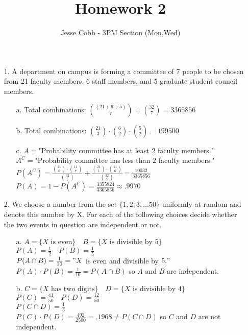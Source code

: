 \documentclass[11pt]{amsart}
\theoremstyle{definition}
\begin{document}
\title{Homework 2}

\author{Jesse Cobb - 3PM Section (Mon,Wed)}

\maketitle

\begin{itemize}
\item[1.] A department on campus is forming a committee of 7 people to be chosen from 21 faculty members, 6 staff members, and 5 graduate student council members.
\begin{itemize}
    \item[a.] Total combinations: ${(21+6+5)\choose 7}={32\choose 7}=3365856$

    \item[b.] Total combinations: ${21\choose 3} \cdot {6\choose 2}\cdot {5\choose 2}=199500$

    \item[c.] $A=$"Probability committee has at least $2$ faculty members."\\
              $A^C=$"Probability committee has less than $2$ faculty members." \\
              $P(A^C)=\frac{{21\choose 0}\cdot {11\choose 7}}{{32\choose 7}}+ \frac{{21\choose 1}\cdot {11\choose 6}}{{32\choose 7}}=\frac{10032}{3365856}$ \\
              $P(A)=1-P(A^C)=\frac{3355824}{3365856}\approx .9970$
    
\end{itemize}

\item[2.] We choose a number from the set $\{1, 2, 3,\ldots50\}$ uniformly at random and denote this number by X. For each of the following choices decide whether the two events in question are independent or not.
\begin{itemize}
    \item[a.] $A=\{X\text{ is even}\} \quad B=\{X\text{ is divisible by }5\}$ \\
              $P(A)=\frac 12\quad P(B)=\frac 15$ \\
              $P(A\cap B)=\frac 1{10}="X$ is even and divisible by $5."$ \\
              $P(A)\cdot P(B)=\frac1{10}=P(A\cap B)$ so $A$ and $B$ are independent.

    \item[b.] $C=\{X\text{ has two digits}\} \quad D=\{X\text{ is divisible by }4\}$ \\
              $P(C)=\frac {41}{50}\quad P(D)=\frac {12}{50}$ \\
              $P(C\cap D)= \frac 15$ \\
              $P(C)\cdot P(D)=\frac{492}{2500}=.1968\ne P(C\cap D)$ so $C$ and $D$ are not independent.


\end{itemize}
\end{itemize}
\end{document}
